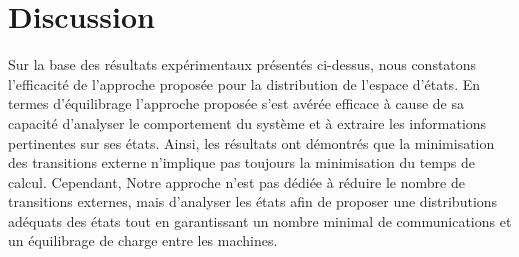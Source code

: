 \section{Discussion}

Sur la base des résultats expérimentaux présentés ci-dessus, nous constatons l’efficacité de l’approche proposée pour la distribution de l’espace d'états. En termes d’équilibrage l’approche proposée s’est avérée efficace à cause de sa capacité d’analyser le comportement du système et à extraire les informations pertinentes sur ses états. Ainsi, les résultats ont démontrés que la minimisation des transitions externe n'implique pas toujours la minimisation du temps de calcul. Cependant, Notre approche n'est pas dédiée à réduire le nombre de transitions externes, mais d'analyser les états afin de proposer une distributions adéquats des états tout en garantissant un nombre minimal de communications et un équilibrage de charge entre les machines.
